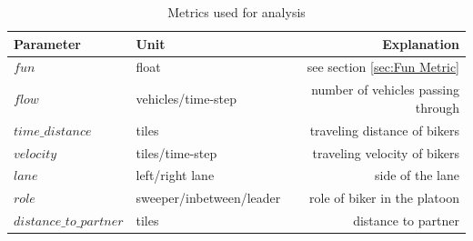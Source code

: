     \begin{table}[htb]
    \centering
    \begin{tabular}{@{}llr@{}} \toprule
        Parameter                   & Unit                      & Explanation        \\ \midrule
        $fun$                       & float                     & see section \ref{sec:Fun Metric} \\
        $flow$                      & vehicles/time-step        & number of vehicles passing through \\
        $time\_distance$             & tiles                     & traveling distance of bikers\\
        $velocity$                  & tiles/time-step           & traveling velocity of bikers\\
        $lane$                      & left/right lane           & side of the lane \\
        $role$                      & sweeper/inbetween/leader  & role of biker in the platoon\\
        $distance\_to\_partner$       & tiles                     & distance to partner \\ \bottomrule
    \end{tabular}
    \caption{Metrics used for analysis} 
    \label{tab:moremetrics}
    \end{table}


